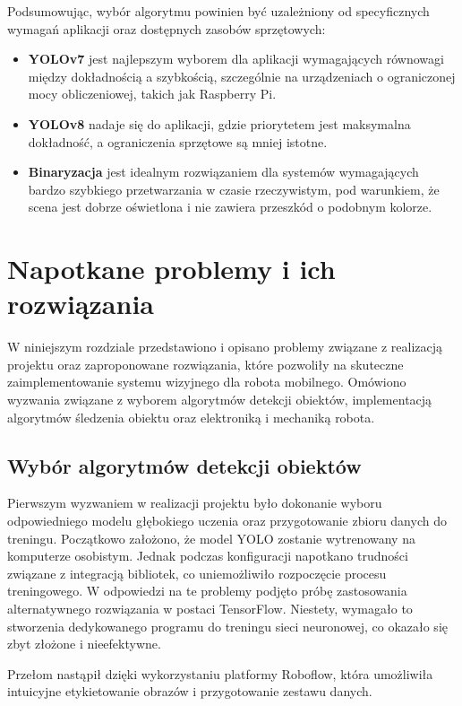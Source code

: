 \documentclass[a4paper,twoside,12pt]{book}
\begin{document}
Podsumowując, wybór algorytmu powinien być uzależniony od specyficznych wymagań aplikacji oraz dostępnych zasobów sprzętowych:
\begin{itemize}
    \item \textbf{YOLOv7} jest najlepszym wyborem dla aplikacji wymagających równowagi między dokładnością a szybkością, szczególnie na urządzeniach o ograniczonej mocy obliczeniowej, takich jak Raspberry Pi.
    \item \textbf{YOLOv8} nadaje się do aplikacji, gdzie priorytetem jest maksymalna dokładność, a ograniczenia sprzętowe są mniej istotne.
    \item \textbf{Binaryzacja} jest idealnym rozwiązaniem dla systemów wymagających bardzo szybkiego przetwarzania w czasie rzeczywistym, pod warunkiem, że scena jest dobrze oświetlona i nie zawiera przeszkód o podobnym kolorze.
\end{itemize}

\chapter{Napotkane problemy i ich rozwiązania}
\label{ch:06}
W niniejszym rozdziale przedstawiono i opisano problemy związane z realizacją projektu oraz zaproponowane rozwiązania, które pozwoliły na skuteczne zaimplementowanie systemu wizyjnego dla robota mobilnego. Omówiono wyzwania związane z wyborem algorytmów detekcji obiektów, implementacją algorytmów śledzenia obiektu oraz elektroniką i mechaniką robota.

\section{Wybór algorytmów detekcji obiektów}

Pierwszym wyzwaniem w realizacji projektu było dokonanie wyboru odpowiedniego modelu głębokiego uczenia oraz przygotowanie zbioru danych do treningu. Początkowo założono, że model YOLO zostanie wytrenowany na komputerze osobistym. Jednak podczas konfiguracji napotkano trudności związane z integracją bibliotek, co uniemożliwiło rozpoczęcie procesu treningowego. W odpowiedzi na te problemy podjęto próbę zastosowania alternatywnego rozwiązania w postaci TensorFlow. Niestety, wymagało to stworzenia dedykowanego programu do treningu sieci neuronowej, co okazało się zbyt złożone i nieefektywne.

Przełom nastąpił dzięki wykorzystaniu platformy Roboflow, która umożliwiła intuicyjne etykietowanie obrazów i przygotowanie zestawu danych.
\end{document}
